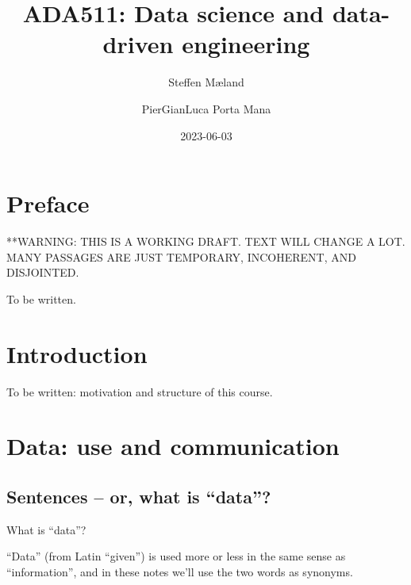 \documentclass[
  letterpaper,
  DIV=11,
  numbers=noendperiod,
  oneside]{scrreprt}
\title{ADA511: Data science and data-driven engineering}
\author{Steffen Mæland \and PierGianLuca Porta Mana}
\date{2023-06-03}
\renewcommand*\contentsname{Table of contents}
\newcommand\contentsname{Table of contents}
\begin{document}
\maketitle
\ifdefined\Shaded\renewenvironment{Shaded}{\begin{tcolorbox}[sharp corners, boxrule=0pt, frame hidden, interior hidden, breakable, borderline west={3pt}{0pt}{shadecolor}, enhanced]}{\end{tcolorbox}}\fi

\renewcommand*\contentsname{Table of contents}
{
\hypersetup{linkcolor=}
\setcounter{tocdepth}{2}
\tableofcontents
}

\hypertarget{preface}{%
\chapter*{Preface}\label{preface}}


**WARNING: THIS IS A WORKING DRAFT. TEXT WILL CHANGE A LOT. MANY
PASSAGES ARE JUST TEMPORARY, INCOHERENT, AND DISJOINTED.

To be written.


\hypertarget{intro}{%
\chapter{Introduction}\label{intro}}

To be written: motivation and structure of this course.


\hypertarget{data-use-and-communication}{%
\chapter{Data: use and communication}\label{data-use-and-communication}}

\hypertarget{sentences-or-what-is-data}{%
\section{Sentences -- or, what is
``data''?}\label{sentences-or-what-is-data}}

What is ``data''?

``Data'' (from Latin ``given'') is used more or less in the same sense
as ``information'', and in these notes we'll use the two words as
synonyms.
\end{document}
